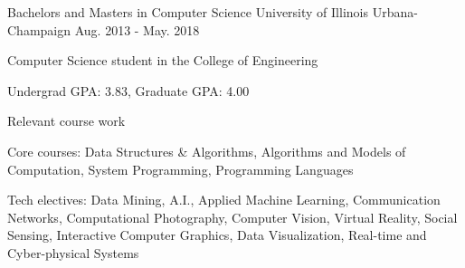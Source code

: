 

\begin{cventries}

  \cventry
    {Bachelors and Masters in Computer Science} %
    {University of Illinois} %
    {Urbana-Champaign} %
    {Aug. 2013 - May. 2018} %
    {
      \begin{cvitems} %
        \item {Computer Science student in the College of Engineering}
        \item {Undergrad GPA: 3.83, Graduate GPA: 4.00}
      \end{cvitems}
    }

  \cventry
    {Relevant course work} %
    {} %
    {} %
    {} %
    {
      \begin{cvitems} %
        \item {Core courses: Data Structures \& Algorithms, Algorithms and Models of Computation, System Programming, Programming Languages}
        \item {Tech electives: Data Mining, A.I., Applied Machine Learning, Communication Networks, Computational Photography, Computer Vision, Virtual Reality, Social Sensing, Interactive Computer Graphics, Data Visualization, Real-time and Cyber-physical Systems}
      \end{cvitems}
    }

\end{cventries}
